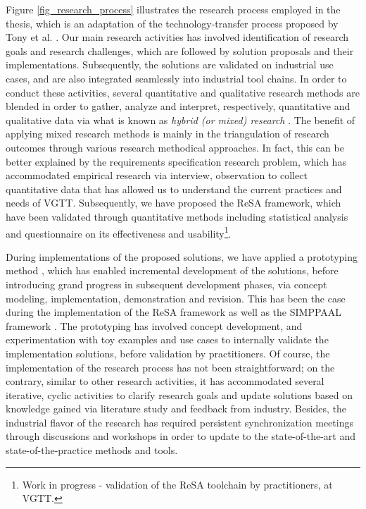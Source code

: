 Figure \ref{fig_research_process} illustrates the research process employed in the thesis, which is an adaptation of the technology-transfer process proposed by Tony et al. \cite{Gorschek2006APractice}. Our main research activities has involved identification of research goals and research challenges, which are followed by solution proposals and their implementations. Subsequently, the solutions are validated on industrial use cases, and are also integrated seamlessly into industrial tool chains. In order to conduct these activities, several quantitative and qualitative research methods are blended in order to gather, analyze and interpret, respectively, quantitative and qualitative data via what is known as \textit{hybrid (or mixed) research} \cite{Creswell2014ResearchApproaches}. The benefit of applying mixed research methods is mainly in the triangulation of research outcomes through various research methodical approaches. In fact, this can be better explained by the requirements specification research problem, which has accommodated empirical research via interview, observation to collect quantitative data that has allowed us to understand the current practices and needs of VGTT. Subsequently, we have proposed the ReSA framework, which have been validated through quantitative methods including statistical analysis and questionnaire on its effectiveness and usability\footnote{Work in progress - validation of the ReSA toolchain by practitioners, at VGTT.}.

During implementations of the proposed solutions, we have applied a prototyping method \cite{Carr2004PrototypingApproaches}, which has enabled incremental development of the solutions, before introducing grand progress in subsequent development phases, via concept modeling, implementation, demonstration and revision. This has been the case during the implementation of the ReSA framework \cite{resatool,Mahmud2017SpecificationLogic} as well as the SIMPPAAL framework \cite{Filipovikj2016SimulinkSystems}. The prototyping has involved concept development, and experimentation with toy examples and use cases to internally validate the implementation solutions, before validation by practitioners. Of course, the implementation of the research process has not been straightforward; on the contrary, similar to other research activities, it has accommodated several iterative, cyclic activities to clarify research goals and update solutions based on knowledge gained via literature study and feedback from industry.  Besides, the industrial flavor of the research has required persistent synchronization meetings through discussions and workshops in order to update to the state-of-the-art and state-of-the-practice methods and tools.
  
